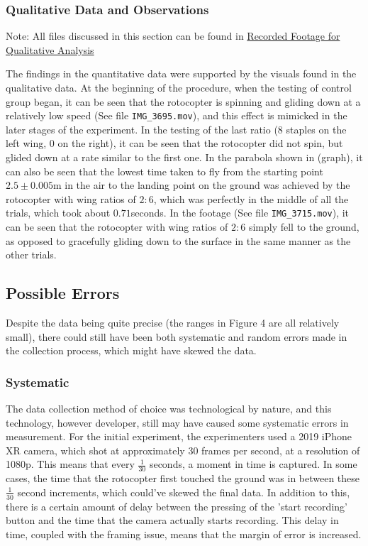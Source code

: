 \documentclass[]{article}
\theoremstyle{definition}
\begin{document}
\subsubsection{Qualitative Data and Observations} \label{Qualitative Data}
Note: All files discussed in this section can be found in \href{https://drive.google.com/open?id=1pxjHiAVFEnyUj759QoK4n0mFYVah-jPS}{Recorded Footage for Qualitative Analysis}

The findings in the quantitative data were supported by the visuals found in the qualitative data. At the beginning of the procedure, when the testing of control group began, it can be seen that the rotocopter is spinning and gliding down at a relatively low speed (See file \verb|IMG_3695.mov|), and this effect is mimicked in the later stages of the experiment. In the testing of the last ratio (8 staples on the left wing, 0 on the right), it can be seen that the rotocopter did not spin, but glided down at a rate similar to the first one. In the parabola shown in (graph), it can also be seen that the lowest time taken to fly from the starting point $2.5\pm0.005$m in the air to the landing point on the ground was achieved by the rotocopter with wing ratios of $2:6$, which was perfectly in the middle of all the trials, which took about $0.71$seconds. In the footage (See file \verb|IMG_3715.mov|), it can be seen that the rotocopter with wing ratios of $2:6$ simply fell to the ground, as opposed to gracefully gliding down to the surface in the same manner as the other trials.

\subsection{Possible Errors}
Despite the data being quite precise (the ranges in Figure 4 are all relatively small), there could still have been both systematic and random errors made in the collection process, which might have skewed the data.

\label{Systematic Errors}
\subsubsection{Systematic}

The data collection method of choice was technological by nature, and this technology, however developer, still may have caused some systematic errors in measurement. For the initial experiment, the experimenters used a 2019 iPhone XR camera, which shot at approximately 30 frames per second, at a resolution of 1080p. This means that every $\frac{1}{30}$ seconds, a moment in time is captured. In some cases, the time that the rotocopter first touched the ground was in between these $\frac{1}{30}$ second increments, which could've skewed the final data. In addition to this, there is a certain amount of delay between the pressing of the 'start recording' button and the time that the camera actually starts recording. This delay in time, coupled with the framing issue, means that the margin of error is increased.
\end{document}
